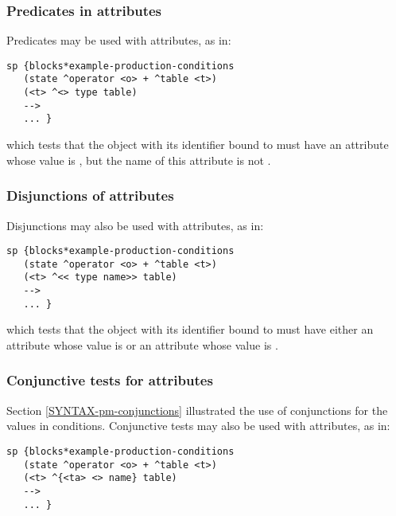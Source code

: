 \subsubsection*{Predicates in attributes}

Predicates may be used with attributes, as in:

\begin{verbatim}
sp {blocks*example-production-conditions
   (state ^operator <o> + ^table <t>)
   (<t> ^<> type table)
   -->
   ... }
\end{verbatim}

which tests that the object with its identifier bound to  must have
an attribute whose value is , but the name of this attribute is
not .

\subsubsection*{Disjunctions of attributes}
\index{<< >>}

Disjunctions may also be used with attributes, as in:

\begin{verbatim}
sp {blocks*example-production-conditions
   (state ^operator <o> + ^table <t>)
   (<t> ^<< type name>> table)
   -->
   ... }
\end{verbatim}

which tests that the object with its identifier bound to  must have
either an attribute  whose value is  or an attribute
 whose value is .

\subsubsection*{Conjunctive tests for attributes}

Section \ref{SYNTAX-pm-conjunctions} illustrated the use of conjunctions for
the values in conditions. Conjunctive tests may also be used with attributes,
as in:

\begin{verbatim}
sp {blocks*example-production-conditions
   (state ^operator <o> + ^table <t>)
   (<t> ^{<ta> <> name} table)
   -->
   ... }
\end{verbatim}


